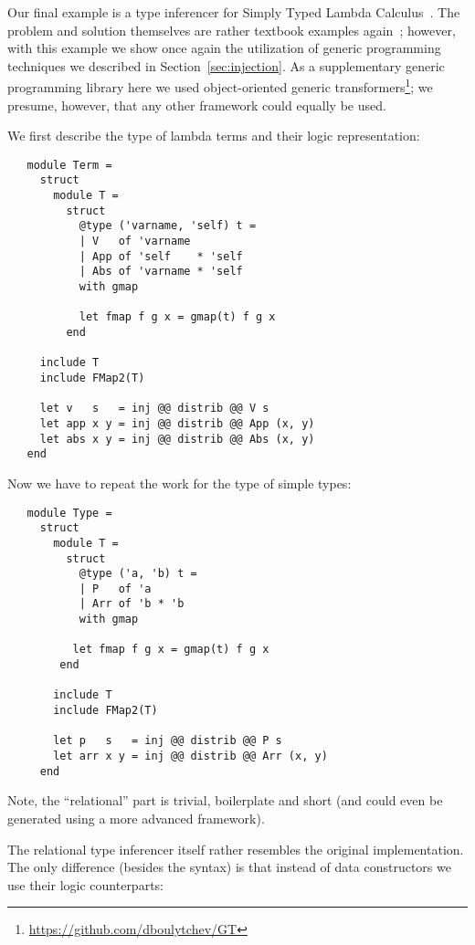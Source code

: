 Our final example is a type inferencer for Simply Typed Lambda Calculus~\cite{Lambda}. The problem and
solution themselves are rather textbook examples again~\cite{TRS, WillThesis}; however, with this example
we show once again the utilization of generic programming techniques we described in Section~\ref{sec:injection}.
As a supplementary generic programming library here we used object-oriented generic transformers\footnote{\url{https://github.com/dboulytchev/GT}};
we presume, however, that any other framework could equally be used.

We first describe the type of lambda terms and their logic representation:

\begin{lstlisting}
   module Term =
     struct
       module T =
         struct
           @type ('varname, 'self) t =
           | V   of 'varname
           | App of 'self    * 'self
           | Abs of 'varname * 'self
           with gmap

           let fmap f g x = gmap(t) f g x
         end

     include T
     include FMap2(T)

     let v   s   = inj @@ distrib @@ V s
     let app x y = inj @@ distrib @@ App (x, y)
     let abs x y = inj @@ distrib @@ Abs (x, y)
   end
\end{lstlisting}

Now we have to repeat the work for the type of simple types:

\begin{lstlisting}
   module Type =
     struct
       module T =
         struct
           @type ('a, 'b) t =
           | P   of 'a
           | Arr of 'b * 'b
           with gmap

          let fmap f g x = gmap(t) f g x
        end

       include T
       include FMap2(T)

       let p   s   = inj @@ distrib @@ P s
       let arr x y = inj @@ distrib @@ Arr (x, y)
     end
\end{lstlisting}

Note, the ``relational'' part is trivial, boilerplate and short (and could even be generated
using a more advanced framework).

The relational type inferencer itself rather resembles the original implementation. The only
difference (besides the syntax) is that instead of data constructors we use their logic
counterparts:

